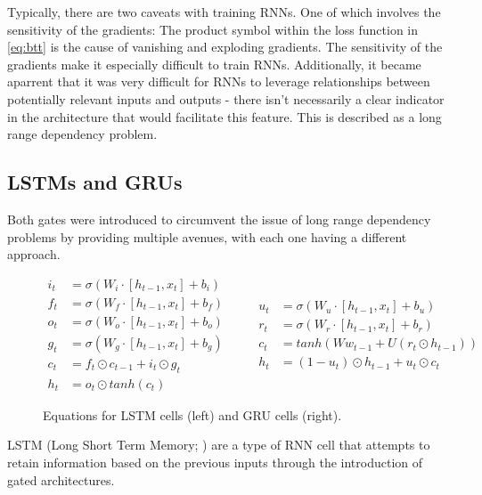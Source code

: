 \documentclass[12pt,twoside]{report}
\begin{document}
Typically, there are two caveats with training RNNs. One of which involves the sensitivity of the gradients: The product symbol within the loss function in \ref{eq:btt} is the cause of vanishing and exploding gradients. The sensitivity of the gradients make it especially difficult to train RNNs. 
Additionally, it became aparrent that it was very difficult for RNNs to leverage relationships between potentially relevant inputs and outputs - there isn't necessarily a clear indicator in the architecture that would facilitate this feature. This is described as a long range dependency problem.

\subsection{LSTMs and GRUs} 

Both gates were introduced to circumvent the issue of long range dependency problems by providing multiple avenues, with each one having a different approach.

\begin{figure}[!ht]
\begin{equation}
  \begin{split}
    i_t &= \sigma(W_i \cdot [h_{t-1},x_t] + b_i) \\
    f_t &= \sigma(W_f \cdot [h_{t-1},x_t] + b_f) \\
		o_t &= \sigma(W_o \cdot [h_{t-1},x_t] + b_o) \\
		g_t &= \sigma(W_g \cdot [h_{t-1},x_t] + b_g) \\
		c_t &= f_t \odot c_{t-1} + i_t \odot g_t \\
		h_t &= o_t \odot tanh(c_t) 
  \end{split}
	\quad\quad
  \begin{split}
		u_t &= \sigma(W_u \cdot [h_{t-1},x_t] + b_u) \\
		r_t &= \sigma(W_r \cdot [h_{t-1},x_t] + b_r) \\
		c_t &= tanh(Ww_{t-1}+U(r_t \odot h_{t-1})) \\
		h_t &= (1-u_{t})\odot h_{t-1} + u_t \odot c_t
  \end{split}
\end{equation}
\caption{Equations for LSTM cells (left) and GRU cells (right).}
\end{figure}
 
LSTM (Long Short Term Memory; \cite{hochreiter_long_1997}) are a type of RNN cell that attempts to retain information based on the previous inputs through the introduction of gated architectures. 
\end{document}

